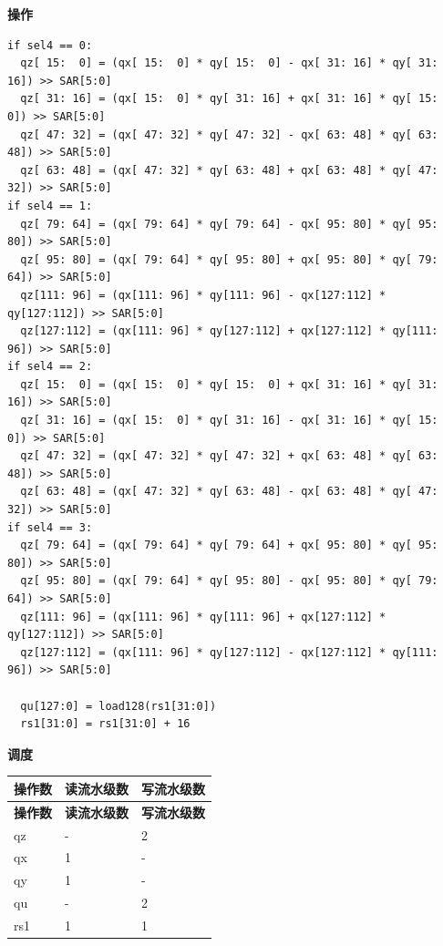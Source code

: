 \textbf{操作}\\
\begin{lstlisting}
if sel4 == 0:
  qz[ 15:  0] = (qx[ 15:  0] * qy[ 15:  0] - qx[ 31: 16] * qy[ 31: 16]) >> SAR[5:0]
  qz[ 31: 16] = (qx[ 15:  0] * qy[ 31: 16] + qx[ 31: 16] * qy[ 15:  0]) >> SAR[5:0]
  qz[ 47: 32] = (qx[ 47: 32] * qy[ 47: 32] - qx[ 63: 48] * qy[ 63: 48]) >> SAR[5:0]
  qz[ 63: 48] = (qx[ 47: 32] * qy[ 63: 48] + qx[ 63: 48] * qy[ 47: 32]) >> SAR[5:0]
if sel4 == 1:
  qz[ 79: 64] = (qx[ 79: 64] * qy[ 79: 64] - qx[ 95: 80] * qy[ 95: 80]) >> SAR[5:0]
  qz[ 95: 80] = (qx[ 79: 64] * qy[ 95: 80] + qx[ 95: 80] * qy[ 79: 64]) >> SAR[5:0]
  qz[111: 96] = (qx[111: 96] * qy[111: 96] - qx[127:112] * qy[127:112]) >> SAR[5:0]
  qz[127:112] = (qx[111: 96] * qy[127:112] + qx[127:112] * qy[111: 96]) >> SAR[5:0]
if sel4 == 2:
  qz[ 15:  0] = (qx[ 15:  0] * qy[ 15:  0] + qx[ 31: 16] * qy[ 31: 16]) >> SAR[5:0]
  qz[ 31: 16] = (qx[ 15:  0] * qy[ 31: 16] - qx[ 31: 16] * qy[ 15:  0]) >> SAR[5:0]
  qz[ 47: 32] = (qx[ 47: 32] * qy[ 47: 32] + qx[ 63: 48] * qy[ 63: 48]) >> SAR[5:0]
  qz[ 63: 48] = (qx[ 47: 32] * qy[ 63: 48] - qx[ 63: 48] * qy[ 47: 32]) >> SAR[5:0]
if sel4 == 3:
  qz[ 79: 64] = (qx[ 79: 64] * qy[ 79: 64] + qx[ 95: 80] * qy[ 95: 80]) >> SAR[5:0]
  qz[ 95: 80] = (qx[ 79: 64] * qy[ 95: 80] - qx[ 95: 80] * qy[ 79: 64]) >> SAR[5:0]
  qz[111: 96] = (qx[111: 96] * qy[111: 96] + qx[127:112] * qy[127:112]) >> SAR[5:0]
  qz[127:112] = (qx[111: 96] * qy[127:112] - qx[127:112] * qy[111: 96]) >> SAR[5:0]

  qu[127:0] = load128(rs1[31:0])
  rs1[31:0] = rs1[31:0] + 16
\end{lstlisting}

\textbf{调度}\\
\begin{longtable}[c]{|l|l|l|}
    \hline
    \rowcolor{lightgray}
    \textbf{操作数} & \textbf{读流水级数} & \textbf{写流水级数} \\\hline
    \endfirsthead
    \hline
    \rowcolor{lightgray}
     \textbf{操作数} & \textbf{读流水级数} & \textbf{写流水级数} \\\hline
    \endhead
    \hline
    \endfoot


    qz & - & 2 \\\hline
     qx & 1 & - \\\hline
     qy & 1 & - \\\hline
     qu & - & 2 \\\hline
     rs1 & 1 & 1

\end{longtable}

